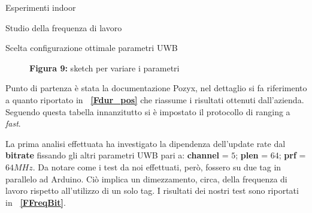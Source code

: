 \documentclass[12pt]{report}
\begin{document}
\begin{section}{Esperimenti indoor}
\begin{subsection}{Studio della frequenza di lavoro}
\begin{subsubsection}{Scelta configurazione ottimale parametri UWB}
\begin{figure}[H]
	 			\caption{\textbf{Figura 9:} sketch per variare i parametri\label{FUWBconfigurator}}
			\end{figure}
			Punto di partenza è stata la documentazione Pozyx, nel dettaglio si fa riferimento a quanto riportato in \textbf{\figurename~\ref{Fdur_pos}} che riassume i risultati ottenuti dall'azienda. Seguendo questa tabella innanzitutto si è impostato il protocollo di ranging a \textit{fast}.

			La prima analisi effettuata ha investigato la dipendenza dell'update rate dal \textbf{bitrate} fissando gli altri parametri UWB pari a: \textbf{channel} = $5$; \textbf{plen} = $64$; \textbf{prf} = $64 MHz$. Da notare come i test da noi effettuati, però, fossero su due tag in parallelo ad Arduino. Ciò implica un						dimezzamento, circa, della frequenza di lavoro rispetto all'utilizzo di un solo tag. I risultati dei nostri test sono riportati in \textbf{\figurename~\ref{FFreqBit}}. 


\end{subsubsection}
\end{subsection}
\end{section}
\end{document}
